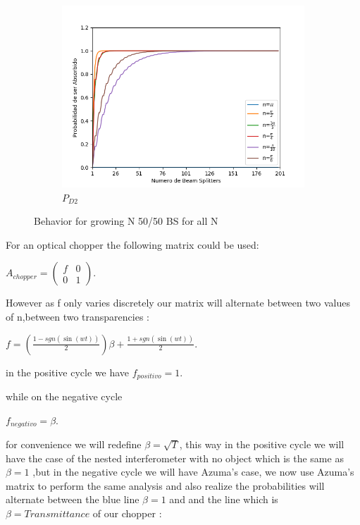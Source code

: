 \documentclass[11pt]{article}
\begin{document}
\begin{figure}[h!]
\begin{subfigure}[b]{0.45\linewidth}
\includegraphics[width=\linewidth]{BsFijo_azumaabs.png}
\caption{$P_{D2}$}
\label{fig:BS1}
\end{subfigure}
\caption{Behavior for growing N 50/50 BS for all N}
\label{fig:westminster}
\end{figure} 
\vspace{10 cm}


For an optical chopper the following matrix could be used:


$A_{chopper}=\begin{pmatrix} f & 0 \\ 0 & 1 \end{pmatrix}$.

However as f only varies discretely our matrix will alternate between two values of n,between two transparencies :



$f=\left(\frac{1-sgn(\sin(wt))}{2} \right)\beta+\frac{1+sgn(\sin(wt))}{2}$.

in the positive cycle we have
$f_{positivo}=1$.

while on the negative cycle 

$f_{negativo}=\beta$.

for convenience we will redefine $\beta=\sqrt{T}$, this way in the positive cycle we will have the case of the nested interferometer with no object which is the same as  $\beta=1$ ,but in the negative cycle we will have  Azuma's case, we now use Azuma's matrix to perform the same analysis and also realize the probabilities will alternate between the blue line $\beta=1$ and and the line which is $\beta=Transmittance$ of our chopper :
\end{document}
